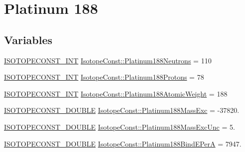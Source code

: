 \hypertarget{group___isotope_const-_platinum-_pt188}{}\section{Platinum 188}
\label{group___isotope_const-_platinum-_pt188}
\subsection*{Variables}
\begin{DoxyCompactItemize}
\item 
\mbox{\hyperlink{group___isotope_const-_macros_ga5f18360b3e99483a35c32d789e62621c}{I\+S\+O\+T\+O\+P\+E\+C\+O\+N\+S\+T\+\_\+\+I\+NT}} \mbox{\hyperlink{group___isotope_const-_platinum-_pt188_ga2b11a31bd2c0819d30f0de3085119dd6}{Isotope\+Const\+::\+Platinum188\+Neutrons}} = 110
\item 
\mbox{\hyperlink{group___isotope_const-_macros_ga5f18360b3e99483a35c32d789e62621c}{I\+S\+O\+T\+O\+P\+E\+C\+O\+N\+S\+T\+\_\+\+I\+NT}} \mbox{\hyperlink{group___isotope_const-_platinum-_pt188_ga08547d11745d815ce0f23f1bd0cd51ac}{Isotope\+Const\+::\+Platinum188\+Protons}} = 78
\item 
\mbox{\hyperlink{group___isotope_const-_macros_ga5f18360b3e99483a35c32d789e62621c}{I\+S\+O\+T\+O\+P\+E\+C\+O\+N\+S\+T\+\_\+\+I\+NT}} \mbox{\hyperlink{group___isotope_const-_platinum-_pt188_gaaee9aa5ae22b08415fe3ba50049232a5}{Isotope\+Const\+::\+Platinum188\+Atomic\+Weight}} = 188
\item 
\mbox{\hyperlink{group___isotope_const-_macros_ga8f45a7272ce02c0b4c65c44636ed719a}{I\+S\+O\+T\+O\+P\+E\+C\+O\+N\+S\+T\+\_\+\+D\+O\+U\+B\+LE}} \mbox{\hyperlink{group___isotope_const-_platinum-_pt188_ga02fcd9de859e6f3f1b3e421b607fd0c3}{Isotope\+Const\+::\+Platinum188\+Mass\+Exc}} = -\/37820.
\item 
\mbox{\hyperlink{group___isotope_const-_macros_ga8f45a7272ce02c0b4c65c44636ed719a}{I\+S\+O\+T\+O\+P\+E\+C\+O\+N\+S\+T\+\_\+\+D\+O\+U\+B\+LE}} \mbox{\hyperlink{group___isotope_const-_platinum-_pt188_ga54e7b27cb46287b32176693d93da7c16}{Isotope\+Const\+::\+Platinum188\+Mass\+Exc\+Unc}} = 5.
\item 
\mbox{\hyperlink{group___isotope_const-_macros_ga8f45a7272ce02c0b4c65c44636ed719a}{I\+S\+O\+T\+O\+P\+E\+C\+O\+N\+S\+T\+\_\+\+D\+O\+U\+B\+LE}} \mbox{\hyperlink{group___isotope_const-_platinum-_pt188_gaa7f4c234faeecc5c92db088f6421675f}{Isotope\+Const\+::\+Platinum188\+Bind\+E\+PerA}} = 7947.
\item 

\end{DoxyCompactItemize}
